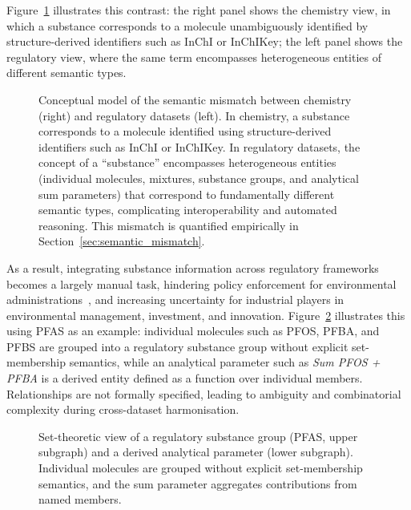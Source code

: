 Figure~\ref{fig:mismatch} illustrates this contrast: the right panel shows the chemistry view, in which a substance corresponds to a molecule unambiguously identified by structure-derived identifiers such as InChI or InChIKey; the left panel shows the regulatory view, where the same term encompasses heterogeneous entities of different semantic types.

\begin{figure}[!ht]
	\centering         
	\caption{Conceptual model of the semantic mismatch between chemistry (right) and regulatory datasets (left). In chemistry, a substance corresponds to a molecule identified using structure-derived identifiers such as InChI or InChIKey. In regulatory datasets, the concept of a ``substance'' encompasses heterogeneous entities (individual molecules, mixtures, substance groups, and analytical sum parameters) that correspond to fundamentally different semantic types, complicating interoperability and automated reasoning. This mismatch is quantified empirically in Section~\ref{sec:semantic_mismatch}.} \label{fig:mismatch}
\end{figure}


As a result, integrating substance information across regulatory frameworks becomes a largely manual task, hindering policy enforcement for environmental administrations~\cite{InteroperableEuropeAct2024}, and increasing uncertainty for industrial players in environmental management, investment, and innovation. Figure~\ref{fig:regulatory_groups} illustrates this using PFAS as an example: individual molecules such as PFOS, PFBA, and PFBS are grouped into a regulatory substance group without explicit set-membership semantics, while an analytical parameter such as \emph{Sum PFOS + PFBA} is a derived entity defined as a function over individual members. Relationships are not formally specified, leading to ambiguity and combinatorial complexity during cross-dataset harmonisation.

\begin{figure}[!ht]
	\centering
	\caption{Set-theoretic view of a regulatory substance group (PFAS, upper subgraph) and a derived analytical parameter (lower subgraph). Individual molecules are grouped without explicit set-membership semantics, and the sum parameter aggregates contributions from named members.}
	\label{fig:regulatory_groups}
\end{figure}



